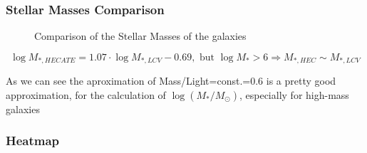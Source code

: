\documentclass[
]{article}
\begin{document}
\subsubsection{Stellar Masses Comparison}

\begin{figure}


\caption{\label{fig-mass-compare}Comparison of the Stellar Masses of the
galaxies}

\end{figure}%

\[
\log{M_{*,HECATE}}=1.07\cdot\log{M_{*,LCV}}-0.69, \text{ but } \log{M_*}>6\Rightarrow M_{*,HEC}\sim M_{*,LCV}
\]

As we can see the aproximation of Mass/Light=const.=0.6 is a pretty good
approximation, for the calculation of \(\log(M_*/M_\odot)\), especially
for high-mass galaxies

\subsubsection{Heatmap}
\end{document}
